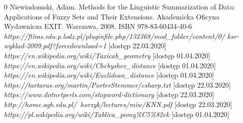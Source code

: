\documentclass{classrep}
\begin{document}
\begin{thebibliography} {0}
 Niewiadomski, Adam. Methods for the Linguistic Summarization of Data: Applications of Fuzzy Sets and Their Extensions. Akademicka Oficyna Wydawnicza EXIT. Warszawa, 2008. ISBN 978-83-60434-40-6
 \textsl{https://ftims.edu.p.lodz.pl/pluginfile.php/132368/mod\_folder/content/0/
ksr-wyklad-2009.pdf?forcedownload=1} [dostęp 22.03.2020]
 \textsl{https://en.wikipedia.org/wiki/Taxicab\_geometry} [dostęp 01.04.2020]
 \textsl{https://en.wikipedia.org/wiki/Chebyshev\_distance} [dostęp 01.04.2020]
 \textsl{https://en.wikipedia.org/wiki/Euclidean\_distance} [dostęp 01.04.2020]
 \textsl{https://tartarus.org/martin/PorterStemmer/csharp.txt} [dostęp 22.03.2020]
 \textsl{https://www.dotnetperls.com/stopword-dictionary} [dostęp 22.03.2020]
 \textsl{http://home.agh.edu.pl/~horzyk/lectures/miw/KNN.pdf} [dostęp 22.03.2020]
 \textsl{https://pl.wikipedia.org/wiki/Tablica\_pomy\%C5\%82ek} [dostęp 01.04.2020]
\end{thebibliography}
\end{document}
